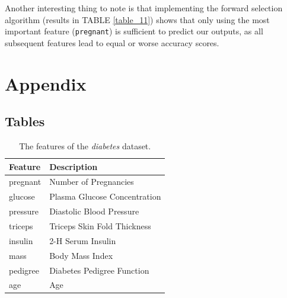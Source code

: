 \documentclass[twoside,twocolumn,10pt]{revtex4-1}
\begin{document}
	Another interesting thing to note is that implementing the forward selection algorithm (results in TABLE \ref{table_11}) shows that only using the most important feature (\texttt{pregnant}) is sufficient to predict our outputs, as all subsequent features lead to equal or worse accuracy scores.
	
	\section{Appendix}
	
	
	\subsection{Tables}
	
	\begin{table}[H]
	\center
		\begin{tabular}{l l}
		\textbf{Feature} & \textbf{Description} \\ 
		\hline
		pregnant & Number of Pregnancies\\
		glucose & Plasma Glucose Concentration\\
		pressure & Diastolic Blood Pressure\\
		triceps & Triceps Skin Fold Thickness\\
		insulin & 2-H Serum Insulin\\
		mass & Body Mass Index\\
		pedigree & Diabetes Pedigree Function\\
		age & Age
		\end{tabular}
		\caption{The features of the \textit{diabetes} dataset.\label{table_1}}
	\end{table}
	
\end{document}
